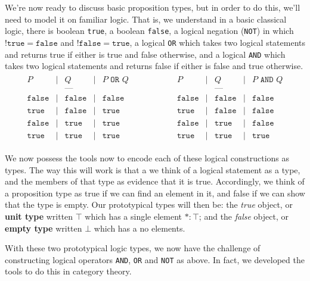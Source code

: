 \documentclass[11pt]{article}
\begin{document}
We're now ready to discuss basic proposition types, but in order to do this, we'll need to model it on familiar logic. That is, we understand in a basic classical logic, there is boolean \texttt{true}, a boolean \texttt{false}, a logical negation (\texttt{NOT}) in which $! \mathtt{true} = \mathtt{false}$ and $!\mathtt{false} = \mathtt{true}$, a logical \texttt{OR} which takes two logical statements and returns true if either is true and false otherwise, and a logical \texttt{AND} which takes two logical statements and returns false if either is false and true otherwise. \begin{gather*}
\begin{matrix}
P & | & Q & | & P \texttt{ OR } Q \\ &&\text{---}&& \\ 
\texttt{false} & | & \texttt{false} & | & \texttt{false} \\
\texttt{true} & | & \texttt{false} & | & \texttt{true} \\
\texttt{false} & | & \texttt{true} & | & \texttt{true} \\
\texttt{true} & | & \texttt{true} & | & \texttt{true}
\end{matrix} \hspace{5em} \begin{matrix}
P & | & Q & | & P \texttt{ AND } Q \\ &&\text{---}&& \\
\texttt{false} & | & \texttt{false} & | & \texttt{false} \\
\texttt{true} & | & \texttt{false} & | & \texttt{false} \\
\texttt{false} & | & \texttt{true} & | & \texttt{false} \\
\texttt{true} & | & \texttt{true} & | & \texttt{true}
\end{matrix}
\end{gather*}

We now possess the tools now to encode each of these logical constructions as types. The way this will work is that a we think of a logical statement as a type, and the members of that type as evidence that it is true. Accordingly, we think of a proposition type as true if we can find an element in it, and false if we can show that the type is empty. Our prototypical types will then be: the \emph{true} object, or \textbf{unit type} written $\top$ which has a single element $* \colon \top$; and the \emph{false} object, or \textbf{empty type} written $\bot$ which has a no elements.

With these two prototypical logic types, we now have the challenge of constructing logical operators \texttt{AND}, \texttt{OR} and \texttt{NOT} as above. In fact, we developed the tools to do this in category theory.
\end{document}
